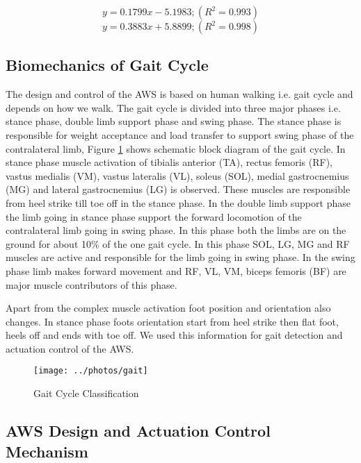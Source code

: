 \documentclass[letterpaper, 10 pt, conference]{ieeeconf}  %
\begin{document}
\begin{equation}\label{pgmunstreched}
y=0.1799x - 5.1983; (R^2=0.993)
\end{equation}
\begin{equation}\label{pgmstreched}
y = 0.3883x + 5.8899; (R^2=0.998)
\end{equation}

\subsection{Biomechanics of Gait Cycle } \label{gaitcycle}
The design and control of the AWS is based on human walking i.e. gait cycle and depends on how we walk. The gait cycle is divided into three major phases i.e. stance phase, double limb support phase and swing phase. The stance phase is responsible for weight acceptance and load transfer to support swing phase of the contralateral limb, Figure \ref{fig:gait} shows schematic block diagram of the gait cycle. In stance phase muscle activation of tibialis anterior (TA), rectus femoris (RF), vastus medialis (VM), vastus lateralis (VL), soleus (SOL), medial gastrocnemius (MG) and lateral gastrocnemius (LG) is observed. These muscles are responsible from heel strike till toe off in the stance phase. In the double limb support phase the limb going in stance phase support the forward locomotion of the contralateral limb going in swing phase. In this phase both the limbs are on the ground for about 10\% of the one gait cycle. In this phase SOL, LG, MG and RF muscles are active and responsible for the limb going in swing phase. In the swing phase limb makes forward movement and RF, VL, VM, biceps femoris (BF) are major muscle contributors of this phase. 

Apart from the complex muscle activation foot position and orientation also changes. In stance phase foots orientation start from heel strike then flat foot, heels off and ends with toe off. We used this information for gait detection and actuation control of the AWS.


\begin{figure}
	\centering
	\texttt{[image: ../photos/gait]}
	\caption{Gait Cycle Classification}
	\label{fig:gait}
\end{figure}


\subsection{AWS Design and Actuation Control Mechanism}
\end{document}
